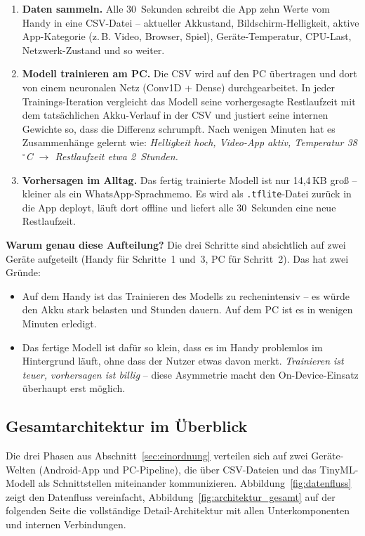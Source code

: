 \documentclass[12pt, a4paper, ngerman]{article}
\newcommand{\datei}[1]{\texttt{\small #1}}
\begin{document}
\begin{enumerate}
\item \textbf{Daten sammeln.} Alle 30~Sekunden schreibt die App
  zehn Werte vom Handy in eine CSV-Datei -- aktueller Akkustand,
  Bildschirm-Helligkeit, aktive App-Kategorie (z.\,B. Video,
  Browser, Spiel), Geräte-Temperatur, CPU-Last,
  Netzwerk-Zustand und so weiter.
\item \textbf{Modell trainieren am PC.} Die CSV wird auf den
  PC übertragen und dort von einem neuronalen Netz (Conv1D +
  Dense) durchgearbeitet. In jeder Trainings-Iteration vergleicht
  das Modell seine vorhergesagte Restlaufzeit mit dem
  tatsächlichen Akku-Verlauf in der CSV und justiert seine
  internen Gewichte so, dass die Differenz schrumpft. Nach
  wenigen Minuten hat es Zusammenhänge gelernt wie:
  \emph{Helligkeit hoch, Video-App aktiv, Temperatur
  38\,$^\circ$C $\to$ Restlaufzeit etwa 2~Stunden.}
\item \textbf{Vorhersagen im Alltag.} Das fertig trainierte Modell
  ist nur 14{,}4\,KB groß -- kleiner als ein WhatsApp-Sprachmemo.
  Es wird als \datei{.tflite}-Datei zurück in die App deployt,
  läuft dort offline und liefert alle 30~Sekunden eine neue
  Restlaufzeit.
\end{enumerate}

\textbf{Warum genau diese Aufteilung?} Die drei Schritte sind
absichtlich auf zwei Geräte aufgeteilt (Handy für Schritte~1 und~3,
PC für Schritt~2). Das hat zwei Gründe:

\begin{itemize}
\item Auf dem Handy ist das Trainieren des Modells zu rechenintensiv
  -- es würde den Akku stark belasten und Stunden dauern. Auf dem
  PC ist es in wenigen Minuten erledigt.
\item Das fertige Modell ist dafür so klein, dass es im Handy
  problemlos im Hintergrund läuft, ohne dass der Nutzer etwas
  davon merkt. \emph{Trainieren ist teuer, vorhersagen ist
  billig} -- diese Asymmetrie macht den On-Device-Einsatz
  überhaupt erst möglich.
\end{itemize}

\newpage

\subsection{Gesamtarchitektur im Überblick}

Die drei Phasen aus Abschnitt~\ref{sec:einordnung} verteilen sich
auf zwei Geräte-Welten (Android-App und PC-Pipeline), die über
CSV-Dateien und das TinyML-Modell als Schnittstellen miteinander
kommunizieren. Abbildung~\ref{fig:datenfluss} zeigt den Datenfluss
vereinfacht, Abbildung~\ref{fig:architektur_gesamt} auf der
folgenden Seite die vollständige Detail-Architektur mit allen
Unterkomponenten und internen Verbindungen.
\end{document}
